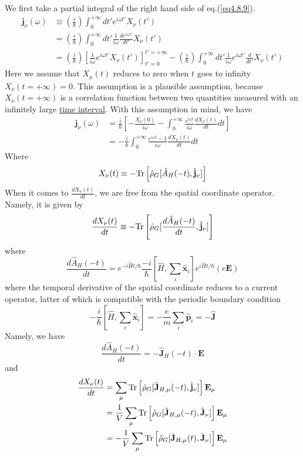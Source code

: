  We first take a partial integral of the right hand side of eq.(\ref{eq4.8.9}).
\[
\begin{aligned}
\mathbf j_\nu (\omega)& \equiv \left(\frac{i}{\hbar}\right) \int_{0}^{+\infty} dt' e^{i\omega t'} X_\nu(t')\\
&=\left(\frac{i}{\hbar}\right) \int_{0}^{+\infty} dt' \frac{1}{i\omega} \frac{d e^{i\omega t'}}{dt'} X_\nu(t')\\
&=\left(\frac{i}{\hbar}\right)  \left[ \frac{1}{i\omega}  e^{i\omega t'} X_\nu(t')\right]_{t'=0}^{t'=+\infty}-\left(\frac{i}{\hbar}\right) \int_{0}^{+\infty} dt' \frac{1}{i\omega} e^{i\omega t'} \frac{d}{dt'} X_\nu(t')
\end{aligned}
\]
 Here we assume that $X_\mu(t)$ reduces to zero when $t$ goes to infinity $X_\nu(t=+\infty)=0$.
 This assumption is a plausible assumption, because $X_\nu(t=+\infty)$ is a correlation function between two quantities measured with an infinitely large \uline{time interval}.
With this assumption in mind, we have 
\begin{equation}\label{eq4.8.10}
\begin{aligned}
\mathbf j_\nu(\omega)&=\frac{i}{\hbar}\left[ -\frac{X_\nu(0)}{i\omega}-\int _0^{+\infty}  \frac{e^{i\omega t}}{i\omega} \frac{dX_\nu(t)}{dt} dt   \right]\\
&=-\frac{i}{\hbar} \int _0^{+\infty} \frac{e^{i\omega t }-1}{i\omega} \frac{dX_\nu(t)}{dt} dt  
\end{aligned}
\end{equation}
 Where
\[
X_\nu(t)\equiv - \text{Tr}\left[\hat \rho_G [\hat A_H(-t),\hat{\mathbf{j}}_\nu]\right]
\]
 When it comes to $\frac{dX_\nu(t)}{dt}$, we are free from the spatial coordinate operator.
 Namely, it is given by
\[
\frac{dX_\nu(t)}{dt}\equiv - \text{Tr}\left[\hat \rho_G [\frac{d\hat A_H(-t)}{dt},\hat{\mathbf{j}}_\nu]\right]
\]
where
\[
\frac{d\hat A_H(-t)}{dt}=e^{-i \hat H t/\hbar}\frac{-i}{\hbar}[\hat  H,\sum_i \hat{\mathbf{x}}_i] e^{i \hat H t/\hbar} (e\mathbf E)
\]
where the temporal derivative of the spatial coordinate reduces to a current operator, latter of which is compatible with the periodic boundary condition
\begin{equation}
-\frac{i}{\hbar}[\hat  H,\sum_i \hat{\mathbf{x}}_i]=-\frac{e}{m}\sum_i\hat {\mathbf{p}}_i=-\hat{\mathbf{J}}
\end{equation}
 Namely, we have
\[
\frac{d\hat A_H(-t)}{dt}=-\hat{\mathbf{J}}_H(-t)\cdot \mathbf{E}
\]
and 
\begin{equation}
\begin{aligned}
\frac{dX_\nu(t)}{dt}&=\sum_\mu \text{Tr} \left[\hat \rho_G[\hat{\mathbf{J}}_{H,\mu}(-t),\hat{\mathbf j}_\nu]\right] \mathbf{E}_\mu\\
&=\frac{1}{V}\sum_\mu \text{Tr} \left[\hat \rho_G[\hat{\mathbf{J}}_{H,\mu}(-t),\hat{\mathbf J}_\nu]\right] \mathbf{E}_\mu\\
&=-\frac{1}{V}\sum_\mu \text{Tr} \left[\hat \rho_G[\hat{\mathbf{J}}_{H,\mu}(t),\hat{\mathbf J}_\nu]\right] \mathbf{E}_\mu
\end{aligned}
\end{equation}
